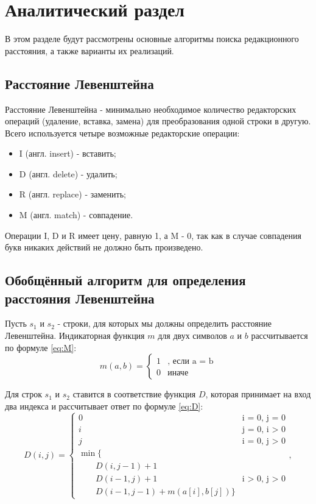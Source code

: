 \chapter{Аналитический раздел}
В этом разделе будут рассмотрены основные алгоритмы поиска редакционного расстояния, а также варианты их реализаций.

\section{Расстояние Левенштейна}
Расстояние Левенштейна\cite{Levenshtein} - минимально необходимое количество редакторских операций (удаление, вставка, замена) для преобразования одной строки в другую.
Всего используется четыре возможные редакторские операции:
\begin{itemize}
    \item I (англ. insert) - вставить;
    \item D (англ. delete) - удалить;
    \item R (англ. replace) - заменить;
    \item M (англ. match) - совпадение.
\end{itemize}
Операции I, D и R имеет цену, равную 1, а M - 0, так как в случае совпадения букв никаких действий не должно быть произведено.

\section{Обобщённый алгоритм для определения расстояния Левенштейна}
Пусть $s_{1}$ и $s_{2}$ - строки, для которых мы должны определить расстояние Левенштейна.
Индикаторная функция $m$ для двух символов $a$ и $b$ рассчитывается по формуле \ref{eq:M}:
\begin{equation}
	\label{eq:M}
	m(a, b) = 
 	\begin{cases}
 		1 &\text{, если a = b}\\
   		0 &\text{иначе}
 	\end{cases}
\end{equation}

Для строк $s_1$ и $s_2$ ставится в соответствие функция $D$, которая принимает на вход два индекса и рассчитывает ответ по формуле \ref{eq:D}:
\begin{equation}
	\label{eq:D}
	D(i, j) = \begin{cases}
		0 &\text{i = 0, j = 0}\\
		i &\text{j = 0, i > 0}\\
		j &\text{i = 0, j > 0}\\
		\min \lbrace \\
			\qquad D(i, j-1) + 1\\
			\qquad D(i-1, j) + 1 &\text{i > 0, j > 0}\\
			\qquad D(i-1, j-1) + m(a[i], b[j])
		\rbrace
	\end{cases},
\end{equation}

